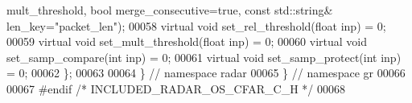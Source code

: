 \begin{DoxyCode}
      mult\_threshold, \textcolor{keywordtype}{bool} merge\_consecutive=\textcolor{keyword}{true}, \textcolor{keyword}{const} std::string& len\_key=\textcolor{stringliteral}{"packet\_len"});
00058       \textcolor{keyword}{virtual} \textcolor{keywordtype}{void} set\_rel\_threshold(\textcolor{keywordtype}{float} inp) = 0;
00059       \textcolor{keyword}{virtual} \textcolor{keywordtype}{void} set\_mult\_threshold(\textcolor{keywordtype}{float} inp) = 0;
00060       \textcolor{keyword}{virtual} \textcolor{keywordtype}{void} set\_samp\_compare(\textcolor{keywordtype}{int} inp) = 0;
00061       \textcolor{keyword}{virtual} \textcolor{keywordtype}{void} set\_samp\_protect(\textcolor{keywordtype}{int} inp) = 0;
00062     \};
00063 
00064   \} \textcolor{comment}{// namespace radar}
00065 \} \textcolor{comment}{// namespace gr}
00066 
00067 \textcolor{preprocessor}{#endif }\textcolor{comment}{/* INCLUDED\_RADAR\_OS\_CFAR\_C\_H */}\textcolor{preprocessor}{}
00068 
\end{DoxyCode}
